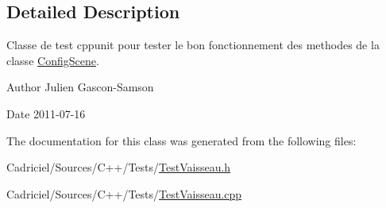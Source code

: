 \subsection{Detailed Description}
Classe de test cppunit pour tester le bon fonctionnement des methodes de la classe \hyperlink{class_config_scene}{Config\-Scene}. 

\begin{DoxyAuthor}{Author}
Julien Gascon-\/\-Samson 
\end{DoxyAuthor}
\begin{DoxyDate}{Date}
2011-\/07-\/16 
\end{DoxyDate}


The documentation for this class was generated from the following files\-:\begin{DoxyCompactItemize}
\item 
Cadriciel/\-Sources/\-C++/\-Tests/\hyperlink{_test_vaisseau_8h}{Test\-Vaisseau.\-h}\item 
Cadriciel/\-Sources/\-C++/\-Tests/\hyperlink{_test_vaisseau_8cpp}{Test\-Vaisseau.\-cpp}\end{DoxyCompactItemize}

